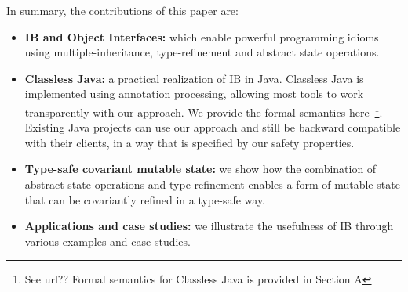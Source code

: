 
In summary, the contributions of this paper are:
\begin{itemize}

\item {\bf IB and Object Interfaces:} which enable
  powerful programming idioms using multiple-inheritance,
  type-refinement and abstract state operations.

\item {\bf Classless Java:} a practical realization of IB in
  Java. Classless Java is implemented using annotation processing,
  allowing most tools to work transparently with our approach. 
  We provide the formal semantics here~\footnote{See url?? Formal semantics for Classless Java is provided in Section A}.
  Existing Java projects can use our approach and still be
  backward compatible with their clients, in a way that is specified
  by our safety properties.

\item {\bf Type-safe covariant mutable state:} we show how the
 combination of abstract state operations and type-refinement enables
 a form of mutable state that can be covariantly refined in a type-safe way.


\item {\bf Applications and case studies:} we illustrate the usefulness of IB
  through various examples and case studies.


\end{itemize}
